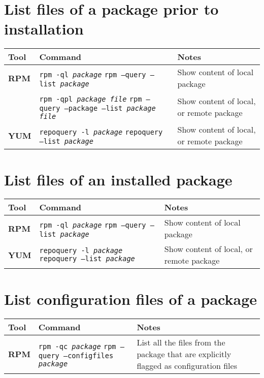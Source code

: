 \documentclass[10pt]{article}
\begin{document}
\newpage

\cheatsheet

\section{List files of a package prior to installation}
\begin{tabular}{ p{3.5cm} p{9cm} p{11cm}}
  \hline
  \rowcolor{Gray}
  \textbf{Tool} & \textbf{Command} & \textbf{Notes} \\
  \hline 
  \textbf{RPM} & \texttt{rpm -ql \textit{package}} \newline \texttt{rpm --query --list \textit{package}} & Show content of local package\\
  \rowcolor{Gray}
  & \texttt{rpm -qpl \textit{package file}} \newline \texttt{rpm --query --package --list \textit{package file}} & Show content of local, or remote package\\
  \textbf{YUM} & \texttt{repoquery -l \textit{package}} \newline \texttt{repoquery --list \textit{package}} & Show content of local, or remote package\\
  \hline
\end{tabular}


\section{List files of an installed package}
\begin{tabular}{ p{3.5cm} p{9cm} p{11cm}}
  \hline
  \rowcolor{Gray}
  \textbf{Tool} & \textbf{Command} & \textbf{Notes} \\
  \hline 
  \textbf{RPM} & \texttt{rpm -ql \textit{package}} \newline \texttt{rpm --query --list \textit{package}} & Show content of local package\\
  \rowcolor{Gray}
  \textbf{YUM} & \texttt{repoquery -l \textit{package}} \newline \texttt{repoquery --list \textit{package}} & Show content of local, or remote package\\
  \hline
\end{tabular}

\section{List configuration files of a package}
\begin{tabular}{ p{3.5cm} p{9cm} p{11cm}}
  \hline
  \rowcolor{Gray}
  \textbf{Tool} & \textbf{Command} & \textbf{Notes} \\
  \hline 
  \textbf{RPM} & \texttt{rpm -qc \textit{package}} \newline \texttt{rpm --query --configfiles \textit{package}} & List all the files from the package that are explicitly flagged as confi\-guration files\\
  \hline
\end{tabular}
\end{document}
